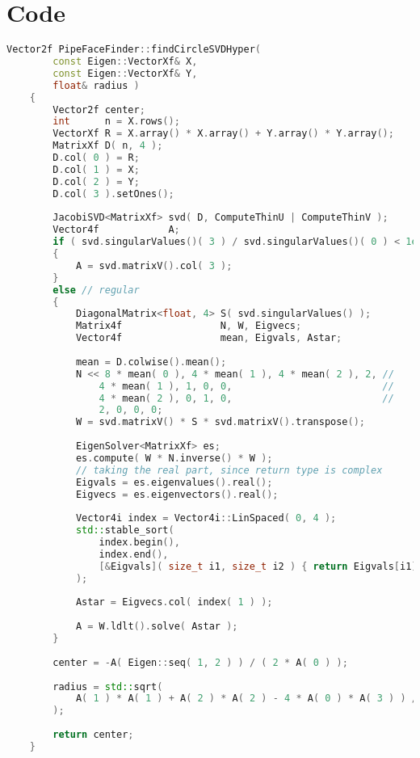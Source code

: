 \section*{Code}
\begin{lstlisting}[language=C++, caption={Implementation of the new circle fit algorithm in the LUA software.}, label={lst:circle_fit}]
    Vector2f PipeFaceFinder::findCircleSVDHyper( 
        const Eigen::VectorXf& X, 
        const Eigen::VectorXf& Y, 
        float& radius )
    {
        Vector2f center;
        int      n = X.rows();
        VectorXf R = X.array() * X.array() + Y.array() * Y.array();
        MatrixXf D( n, 4 );
        D.col( 0 ) = R;
        D.col( 1 ) = X;
        D.col( 2 ) = Y;
        D.col( 3 ).setOnes();
    
        JacobiSVD<MatrixXf> svd( D, ComputeThinU | ComputeThinV );
        Vector4f            A;
        if ( svd.singularValues()( 3 ) / svd.singularValues()( 0 ) < 1e-12 ) // singular
        {
            A = svd.matrixV().col( 3 );
        }
        else // regular
        {
            DiagonalMatrix<float, 4> S( svd.singularValues() );
            Matrix4f                 N, W, Eigvecs;
            Vector4f                 mean, Eigvals, Astar;
    
            mean = D.colwise().mean();
            N << 8 * mean( 0 ), 4 * mean( 1 ), 4 * mean( 2 ), 2, //
                4 * mean( 1 ), 1, 0, 0,                          //
                4 * mean( 2 ), 0, 1, 0,                          //
                2, 0, 0, 0;
            W = svd.matrixV() * S * svd.matrixV().transpose();
    
            EigenSolver<MatrixXf> es;
            es.compute( W * N.inverse() * W );
            // taking the real part, since return type is complex
            Eigvals = es.eigenvalues().real();
            Eigvecs = es.eigenvectors().real();
    
            Vector4i index = Vector4i::LinSpaced( 0, 4 );
            std::stable_sort(
                index.begin(), 
                index.end(), 
                [&Eigvals]( size_t i1, size_t i2 ) { return Eigvals[i1] < Eigvals[i2]; } 
            );
    
            Astar = Eigvecs.col( index( 1 ) );
    
            A = W.ldlt().solve( Astar );
        }
    
        center = -A( Eigen::seq( 1, 2 ) ) / ( 2 * A( 0 ) );
    
        radius = std::sqrt( 
            A( 1 ) * A( 1 ) + A( 2 ) * A( 2 ) - 4 * A( 0 ) * A( 3 ) ) / ( 2 * std::abs( A( 0 ) ) 
        );
    
        return center;
    }
\end{lstlisting}


